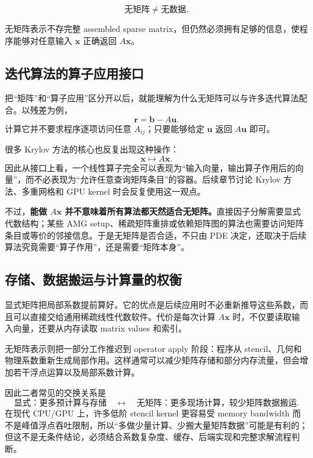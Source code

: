 \begin{keybox}
\[
\boxed{
\text{无矩阵}\neq\text{无数据}.
}
\]

无矩阵表示不存完整 assembled sparse matrix，但仍然必须拥有足够的信息，使程序能够对任意输入 $\bm x$ 正确返回 $A\bm x$。
\end{keybox}

\subsection{迭代算法的算子应用接口}

把“矩阵”和“算子应用”区分开以后，就能理解为什么无矩阵可以与许多迭代算法配合。以残差为例，
\begin{equation}
\bm r=\bm b-A\bm u.
\end{equation}
计算它并不要求程序逐项访问任意 $A_{ij}$；只要能够给定 $\bm u$ 返回 $A\bm u$ 即可。

很多 Krylov 方法的核心也反复出现这种操作：
\begin{equation}
\bm x
\longmapsto
A\bm x.
\end{equation}
因此从接口上看，一个线性算子完全可以表现为“输入向量，输出算子作用后的向量”，而不必表现为“允许任意查询矩阵条目”的容器。后续章节讨论 Krylov 方法、多重网格和 GPU kernel 时会反复使用这一观点。

不过，\textbf{能做 $A\bm x$ 并不意味着所有算法都天然适合无矩阵。}直接因子分解需要显式代数结构；某些 AMG setup、稀疏矩阵重排或依赖矩阵图的算法也需要访问矩阵条目或等价的邻接信息。于是无矩阵是否合适，不只由 PDE 决定，还取决于后续算法究竟需要“算子作用”，还是需要“矩阵本身”。

\subsection{存储、数据搬运与计算量的权衡}

显式矩阵把局部系数提前算好。它的优点是后续应用时不必重新推导这些系数，而且可以直接交给通用稀疏线性代数软件。代价是每次计算 $A\bm x$ 时，不仅要读取输入向量，还要从内存读取 matrix values 和索引。

无矩阵表示则把一部分工作推迟到 operator apply 阶段：程序从 stencil、几何和物理系数重新生成局部作用。这样通常可以减少矩阵存储和部分内存流量，但会增加若干浮点运算以及局部系数计算。

因此二者常见的交换关系是
\begin{equation}
\boxed{
\text{显式：更多预计算与存储}
\quad\longleftrightarrow\quad
\text{无矩阵：更多现场计算，较少矩阵数据搬运}.
}
\label{eq:discretization-explicit-mf-tradeoff}
\end{equation}
在现代 CPU/GPU 上，许多低阶 stencil kernel 更容易受 memory bandwidth 而不是峰值浮点吞吐限制，所以“多做少量计算、少搬大量矩阵数据”可能是有利的；但这不是无条件结论，必须结合系数复杂度、缓存、后端实现和完整求解流程判断。


